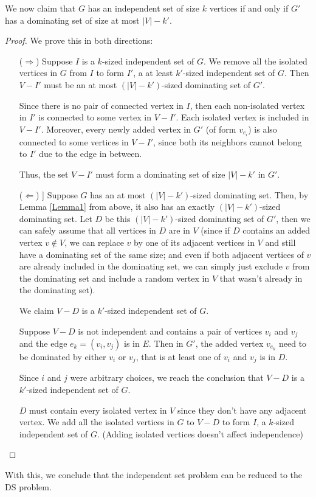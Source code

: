 \documentclass[11pt, fleqn]{article}
\begin{document}
\begin{itemize}
    We now claim that $G$ has an independent set of size $k$ vertices if and only if $G'$ has a dominating set of size at most $|V| - k'$.
    \begin{proof}
        We prove this in both directions:
        \begin{itemize}
            \item[($\Rightarrow$)] Suppose $I$ is a $k$-sized independent set of $G$. We remove all the isolated vertices in $G$ from $I$ to form $I'$, a at least $k'$-sized independent set of $G$. Then $V - I'$ must be an at most $(|V| - k')$-sized dominating set of $G'$.
            
            Since there is no pair of connected vertex in $I$, then each non-isolated vertex in $I'$ is connected to some vertex in $V - I'$. Each isolated vertex is included in $V - I'$. Moreover, every newly added vertex in $G'$ (of form $v_{e_i}$) is also connected to some vertices in $V - I'$, since both its neighbors cannot belong to $I'$ due to the edge in between.
            
            Thus, the set $V - I'$ must form a dominating set of size $|V| - k'$ in $G'$.
            \item[($\Leftarrow$)] ] Suppose $G$ has an at most $(|V| - k')$-sized dominating set. Then, by Lemma \ref{Lemma1} from above, it also has an exactly $(|V| - k')$-sized dominating set. Let $D$ be this $(|V|-k')$-sized dominating set of $G'$, then we can safely assume that all vertices in $D$ are in $V$ (since if $D$ contains an added vertex $v\notin V$, we can replace $v$ by one of its adjacent vertices in $V$ and still have a dominating set of the same size; and even if both adjacent vertices of $v$ are already included in the dominating set, we can simply just exclude $v$ from the dominating set and include a random vertex in $V$ that wasn't already in the dominating set).

            We claim $V - D$ is a $k'$-sized independent set of $G$.
            
            Suppose $V - D$ is not independent and contains a pair of vertices $v_i$ and $v_j$ and the edge $e_k = (v_i, v_j)$ is in $E$. Then in $G'$, the added vertex $v_{e_k}$ need to be dominated by either $v_i$ or $v_j$, that is at least one of $v_i$ and $v_j$ is in $D$.
            
            Since $i$ and $j$ were arbitrary choices, we reach the conclusion that $V - D$ is a $k'$-sized independent set of $G$.
            
            $D$ must contain every isolated vertex in $V$ since they don't have any adjacent vertex. We add all the isolated vertices in $G$ to $V - D$ to form $I$, a $k$-sized independent set of $G$. (Adding isolated vertices doesn't affect independence)
        \end{itemize}
    \end{proof}
    With this, we conclude that the independent set problem can be reduced to the DS problem.
\end{itemize}
\end{document}
